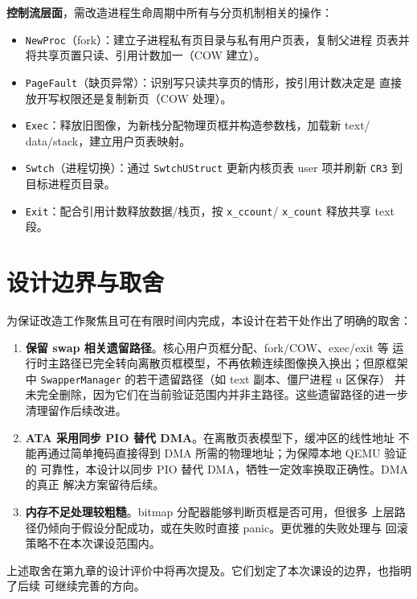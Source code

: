 \textbf{控制流层面}，需改造进程生命周期中所有与分页机制相关的操作：
\begin{itemize}
  \item \texttt{NewProc}（fork）：建立子进程私有页目录与私有用户页表，复制父进程
        页表并将共享页置只读、引用计数加一（COW 建立）。
  \item \texttt{PageFault}（缺页异常）：识别写只读共享页的情形，按引用计数决定是
        直接放开写权限还是复制新页（COW 处理）。
  \item \texttt{Exec}：释放旧图像，为新栈分配物理页框并构造参数栈，加载新 text/
        data/stack，建立用户页表映射。
  \item \texttt{Swtch}（进程切换）：通过 \texttt{SwtchUStruct} 更新内核页表 user
        项并刷新 \texttt{CR3} 到目标进程页目录。
  \item \texttt{Exit}：配合引用计数释放数据/栈页，按 \texttt{x\_ccount}/
        \texttt{x\_count} 释放共享 text 段。
\end{itemize}

\section{设计边界与取舍}
为保证改造工作聚焦且可在有限时间内完成，本设计在若干处作出了明确的取舍：

\begin{enumerate}
  \item \textbf{保留 swap 相关遗留路径}。核心用户页框分配、fork/COW、exec/exit 等
        运行时主路径已完全转向离散页框模型，不再依赖连续图像换入换出；但原框架中
        \texttt{SwapperManager} 的若干遗留路径（如 text 副本、僵尸进程 u 区保存）
        并未完全删除，因为它们在当前验证范围内并非主路径。这些遗留路径的进一步
        清理留作后续改进。
  \item \textbf{ATA 采用同步 PIO 替代 DMA}。在离散页表模型下，缓冲区的线性地址
        不能再通过简单掩码直接得到 DMA 所需的物理地址；为保障本地 QEMU 验证的
        可靠性，本设计以同步 PIO 替代 DMA，牺牲一定效率换取正确性。DMA 的真正
        解决方案留待后续。
  \item \textbf{内存不足处理较粗糙}。bitmap 分配器能够判断页框是否可用，但很多
        上层路径仍倾向于假设分配成功，或在失败时直接 panic。更优雅的失败处理与
        回滚策略不在本次课设范围内。
\end{enumerate}

上述取舍在第九章的设计评价中将再次提及。它们划定了本次课设的边界，也指明了后续
可继续完善的方向。
